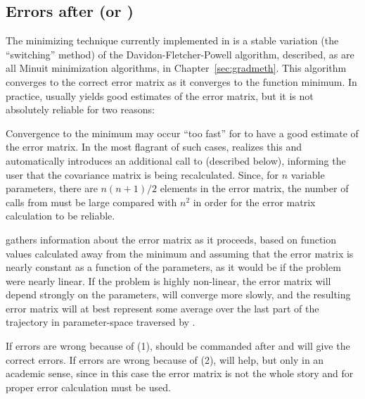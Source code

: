 \subsection{Errors after \protect{} (or \protect{})}
 
The minimizing technique currently implemented in  is a 
stable variation (the ``switching'' method) of the 
Davidon-Fletcher-Powell algorithm, described, as are all Minuit minimization 
algorithms, in Chapter~\ref{sec:gradmeth}.
This algorithm 
converges to the correct error matrix as it converges to the function 
minimum. In practice,  usually yields good estimates of the 
error matrix, but it is not absolutely reliable for two reasons:
 
\begin{OL}
\item Convergence to the minimum may occur ``too fast'' for  to 
      have a good estimate of the error matrix. In the most flagrant of 
      such cases,  realizes this and automatically introduces an 
      additional call to  (described below), informing the user that 
      the covariance matrix is being recalculated. Since, for $n$ variable 
      parameters, there are $n(n+1)/2$ elements in the error matrix, the 
      number of  calls from  must be large compared with 
      $n^2$ in order for the  error matrix calculation to be reliable.
\item {} gathers information about the error matrix as it 
      proceeds, based on function values calculated away from the 
      minimum and assuming that the error matrix is nearly constant as a 
      function of the parameters, as it would be if the problem were 
      nearly linear. If the problem is highly non-linear, the error matrix 
      will depend strongly on the parameters,  will converge more 
      slowly, and the resulting error matrix will at best represent some 
      average over the last part of the trajectory in parameter-space 
      traversed by .
\end{OL}
 
If  errors are wrong because of (1),
 should be commanded after  
and will give the correct errors. If  
errors are wrong because of (2),  will help, but only in an 
academic sense, since in this case the error matrix is not the whole 
story and for proper error calculation  must be used.
 
